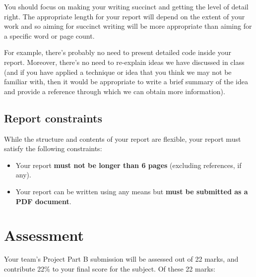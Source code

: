 \documentclass[]{article}
\begin{document}
You should focus on making your writing succinct and getting the level
of detail right.
%
The appropriate length for your report will depend on the extent of
your work and so aiming for succinct writing will be more appropriate
than aiming for a specific word or page count.

For example, there's probably no need to present detailed
code inside your report.
% 
Moreover, there's no need to re-explain ideas we have discussed
in class
(and if you have applied a technique or idea that you think we may
not be familiar with, then it would be appropriate to write a brief
summary of the idea and provide a reference through which we can
obtain more information).


\subsection{Report constraints}

While the structure and contents of your report are flexible,
your report must satisfy the following constraints:
%
\begin{itemize}
    \item
        Your report \textbf{must not be longer than 6 pages}
        (excluding references, if any).
    \item
        Your report can be written using any means but
        \textbf{must be submitted as a PDF document}.
\end{itemize}



\section{Assessment}
\label{sec:assessment}

Your team's Project Part B submission will be assessed out of 22 marks,
and contribute 22\% to your final score for the subject. Of these 22
marks:
\end{document}
